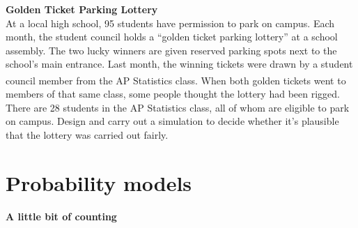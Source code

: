 \documentclass[a4paper, 12pt,twoside]{book}
\begin{document}
\colorbox{champagne}{\parbox{\textwidth}{
\textbf{Golden Ticket Parking Lottery}
\vspace{0.3cm}\\
At a local high school, 95 students have permission to park on campus. Each month, the student council holds a “golden ticket parking lottery” at a school assembly. The two lucky winners are given reserved parking spots next to the school’s main  entrance. Last month, the winning tickets were drawn by a student council member from the AP\textsuperscript{\textregistered} Statistics class. When both golden tickets went to members of that same class, some people thought the lottery had been rigged. There are 28 students in the AP Statistics class, all of whom are eligible to park on campus. Design and carry out a simulation to decide whether it’s plausible that the lottery was carried out fairly.
}}
\newpage

\section{\large{Probability models}}
\vspace{0.3cm}
\textbf{A little bit of counting}
\vspace{0.3cm}\\
\end{document}
